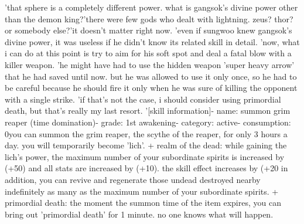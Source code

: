 'that sphere is a completely different power.
 what is gangsok's divine power other than the demon king?'there were few gods who dealt with lightning.
 zeus? thor? or somebody else?'it doesn't matter right now.
'even if sungwoo knew gangsok's divine power, it was useless if he didn't know its related skill in detail.
'now, what i can do at this point is try to aim for his soft spot and deal a fatal blow with a killer weapon.
'he might have had to use the hidden weapon 'super heavy arrow' that he had saved until now.
but he was allowed to use it only once, so he had to be careful because he should fire it only when he was sure of killing the opponent with a single strike.
'if that's not the case, i should consider using primordial death, but that's really my last resort.
'[skill information]- name: summon grim reaper (time domination)- grade: 1st awakening- category: active- consumption: 0you can summon the grim reaper, the scythe of the reaper, for only 3 hours a day.
 you will temporarily become 'lich'.
+ realm of the dead: while gaining the lich's power, the maximum number of your subordinate spirits is increased by (+50) and all stats are increased by (+10).
 the skill effect increases by (+20%
in addition, you can revive and regenerate those undead destroyed nearby indefinitely as many as the maximum number of your subordinate spirits.
 + primordial death: the moment the summon time of the item expires, you can bring out 'primordial death' for 1 minute.
 no one knows what will happen.

